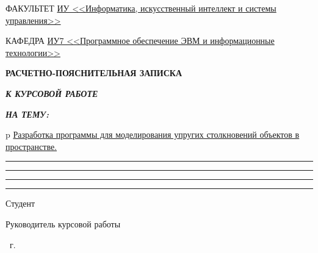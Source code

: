 \begin{titlepage}
\begin{center}
        \begin{flushleft}
            {ФАКУЛЬТЕТ \uline{ИУ <<Информатика, искусственный интеллект и системы управления>> \hfill}}

            \vspace{0.5cm}

            {КАФЕДРА \uline{ИУ7 <<Программное обеспечение ЭВМ и информационные технологии>> \hfill}}
        \end{flushleft}

        \vspace{2cm}

        {
            \Large{\textbf{РАСЧЕТНО-ПОЯСНИТЕЛЬНАЯ ЗАПИСКА}}

            \vspace{1.0cm}

            \large{\textbf{\textit{К КУРСОВОЙ РАБОТЕ}}}

            \vspace{0.75cm}

            \large{\textbf{\textit{НА ТЕМУ:}}}
        }

        \vspace{0.5cm}

        \begin{tabular}{p{\textwidth}}
            \uline
            {
                Разработка программы для моделирования упругих столкновений
                объектов в пространстве. \hfill
            }
            \rule{\linewidth}{0.4pt}
            \rule{\linewidth}{0.4pt}
            \rule{\linewidth}{0.4pt}
            \rule{\linewidth}{0.4pt}
        \end{tabular}

        \vfill

        \begin{flushleft}
            {Студент } \hfill
            
            \vspace{1.0cm}

            {Руководитель курсовой работы} \hfill

            \vspace{1.0cm}
        \end{flushleft}

        \the\year\ г.

    \end{center}
\end{titlepage}

